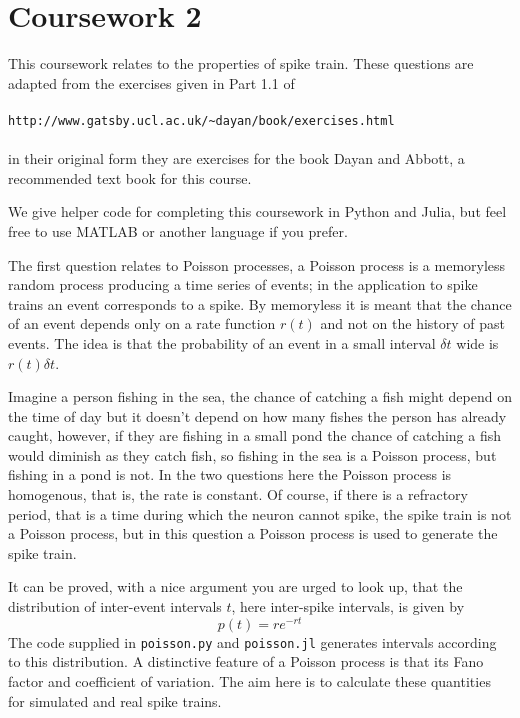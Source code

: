 \documentclass[12pt]{article}
\begin{document}
\section*{Coursework 2}

This coursework relates to the properties of spike train. These
questions are adapted from the exercises given in Part 1.1 of\\
\\
\texttt{http://www.gatsby.ucl.ac.uk/\~{}dayan/book/exercises.html}\\ 
\\
in their original form they are exercises for the book Dayan and Abbott,
a recommended text book for this course.

We give helper code for completing this coursework in Python and Julia, but feel free to use MATLAB or another language if you prefer.

The first question relates to Poisson processes, a Poisson process
is a memoryless random process producing a time series of events; in
the application to spike trains an event corresponds to a spike. By
memoryless it is meant that the chance of an event depends only on a
rate function $r(t)$ and not on the history of past events. The idea
is that the probability of an event in a small interval $\delta t$ wide is $r(t)\delta t$.

Imagine a person fishing in the sea, the chance of catching a fish
might depend on the time of day but it doesn't depend on how many
fishes the person has already caught, however, if they are fishing in
a small pond the chance of catching a fish would diminish as they
catch fish, so fishing in the sea is a Poisson process, but fishing in
a pond is not. In the two questions here the Poisson process is
homogenous, that is, the rate is constant. Of course, if there is a
refractory period, that is a time during which the neuron cannot
spike, the spike train is not a Poisson process, but in this question
a Poisson process is used to generate the spike train.

It can be proved, with a nice argument you are urged to look up, that
the distribution of inter-event intervals $t$, here inter-spike intervals,
is given by
\begin{equation}
p(t)=re^{-rt}
\end{equation}
The code supplied in \texttt{poisson.py} and \texttt{poisson.jl}
generates intervals according to this distribution. A distinctive
feature of a Poisson process is that its Fano factor and coefficient
of variation. The aim here is to calculate these quantities for
simulated and real spike trains.
\end{document}
